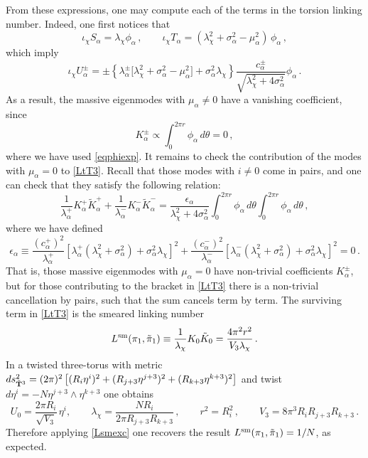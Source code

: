 \documentclass[11pt]{article}
\def\a {\alpha}
\def\be{\begin{equation}}
\def\ee{\end{equation}}
\def\th {{\theta}}
\begin{document}
From these expressions, one may compute each of the terms in the torsion linking number. Indeed, one first notices that
\begin{equation}
	\iota_\chi S_\a =   \lambda_\chi \phi_\a \,, \qquad \iota_\chi T_\a = ( \lambda_\chi^2 + \sigma_\a^2 -  \mu_\a^2) \, \phi_\a \,,
\end{equation}
which imply
\begin{equation}
	\iota_\chi U^\pm_\a = \pm \left\{\lambda^\pm_\a\bigg[ \lambda_\chi^2+\sigma_\a^2-\mu_\a^2\bigg]+\sigma_\a^2  \lambda_\chi\right\}\frac{c_\a^{\pm} }{\sqrt{ \lambda_\chi^2 + 4 \sigma_\a^2}} \phi_\a\,.
\end{equation}
As a result, the  massive eigenmodes with $\mu_\a \neq 0$ have a vanishing coefficient, since
\begin{equation}
	K^\pm_\a \propto \int_0^{2 \pi r}  \phi_\a \, d \th = 0  \,,
\end{equation}
where we have used \eqref{eqphiexp}. It remains to check the contribution of the modes with $\mu_\a = 0$ to \eqref{LtT3}. Recall that those modes with $i\neq 0$ come in pairs, and one can check that they satisfy the following relation:
\begin{equation}
	\frac{1}{\lambda_\a^+} K^+_\a \tilde{K}^+_\a + \frac{1}{\lambda_\a^-} K^-_\a \tilde{K}^-_\a = \frac{\epsilon_\a}{ \lambda_\chi^2 + 4\sigma_\a^2} \int_0^{2 \pi r}  \phi_\a \, d\th \int_0^{2 \pi r}  \phi_\a \, d\th \,,
\end{equation}
where we have defined
\begin{equation}\label{eqdelta}
	\epsilon_\a \equiv \frac{(c_\a^{+})^2}{\lambda_\a^+} \left[\lambda_\a^+( \lambda_\chi^2+\sigma_\a^2) + \sigma_\a^2  \lambda_\chi\right]^2 + \frac{(c_\a^{-})^2}{\lambda^-_\a} \left[\lambda_\a^-( \lambda_\chi^2+\sigma_\a^2) + \sigma_\a^2  \lambda_\chi\right]^2 = 0 \,.
\end{equation}
That is, those massive eigenmodes with $\mu_\a =0$ have non-trivial coefficients $K_\a^\pm$, but for those contributing to the  bracket in \eqref{LtT3} there is a non-trivial cancellation by pairs, such that the sum cancels term by term. The surviving term in \eqref{LtT3} is the smeared linking number
\begin{equation}
	L^{\rm sm}(\pi_1,\tilde{\pi}_1) \equiv \frac{1}{ \lambda_\chi} K_0 \tilde{K}_0  =  \frac{4\pi^2r^2}{V_3  \lambda_\chi}\,.
 	\label{Lsmexc}
\end{equation}
In a twisted three-torus with metric $ds^2_{\tilde{\bf T}^3} = (2\pi)^2 \left[(R_i\eta^i)^2 + (R_{j+3}\eta^{j+3})^2 + (R_{k+3}\eta^{k+3})^2 \right]$ and twist $d\eta^i = - N \eta^{j+3} \wedge \eta^{k+3}$ one obtains 
\be
U_0 =\frac{2\pi R_i}{\sqrt{V_3}}\,\eta^i ,\qquad\lambda_\chi = \frac{NR_i}{2\pi R_{j+3}R_{k+3}}\, , \qquad r^2 = R_i^2\, , \qquad V_3 = 8\pi^3 R_iR_{j+3}R_{k+3} \, .\label{eq: U0T3}
\ee
Therefore applying \eqref{Lsmexc} one recovers the result $L^{\rm sm}(\pi_1,\tilde{\pi}_1) = 1/N$, as expected.
\end{document}
